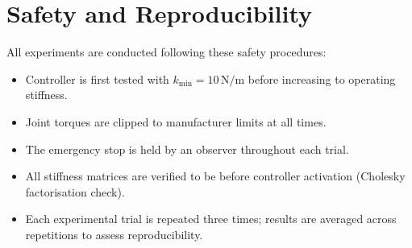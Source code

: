 \section{Safety and Reproducibility}
\label{sec:safety}

All experiments are conducted following these safety procedures:

\begin{itemize}
  \item Controller is first tested with $k_{\min} = 10\,\mathrm{N/m}$
        before increasing to operating stiffness.
  \item Joint torques are clipped to manufacturer limits at all times.
  \item The emergency stop is held by an observer throughout each trial.
  \item All stiffness matrices are verified to be  before controller
        activation (Cholesky factorisation check).
  \item Each experimental trial is repeated three times; results are
        averaged across repetitions to assess reproducibility.
\end{itemize}
